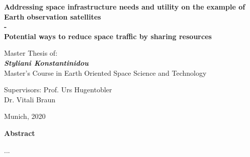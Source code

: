 \vspace{3cm}
\begin{center}
\Large{\textbf{Addressing space infrastructure needs and utility on the example of Earth observation satellites \\- \\}}
\Large{\textbf{Potential ways to reduce space traffic by sharing resources}}
\end{center}
\vspace{2.1cm}
\begin{center}
\large{Master Thesis of:\\
\textit{\textbf{Styliani Konstantinidou}} \\}
\vspace{1cm}
\large{Master's Course in Earth Oriented Space Science and Technology}
\end{center}

\vspace{2.5cm}
\begin{flushleft}
\large{Supervisors: Prof. Urs Hugentobler \\ \hspace*{2.7cm}Dr. Vitali Braun}
\end{flushleft}

\vfill
\begin{center}
\normalsize Munich, 2020
\end{center}



\newpage \mbox{} %
\newpage \mbox{}
\thispagestyle{empty}
\begin{center}
\Large{\textbf{Abstract}} 
\end{center}
\par 	
...

%


\vspace{\fill} %

